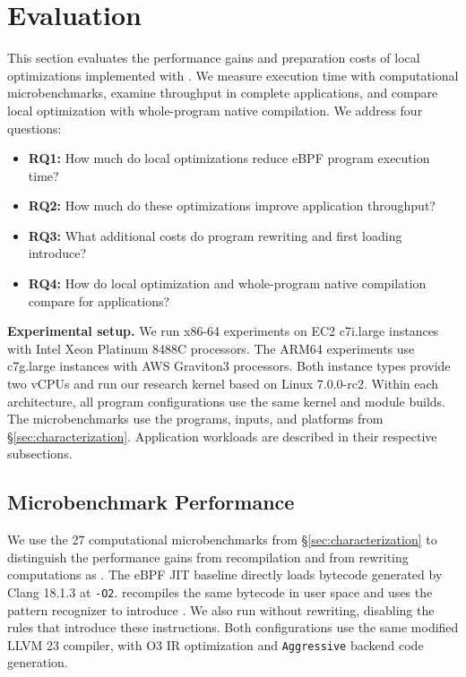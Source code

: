 \section{Evaluation}
\label{sec:eval}

This section evaluates the performance gains and preparation costs of local optimizations implemented with \kinsns. We measure execution time with computational microbenchmarks, examine throughput in complete applications, and compare local optimization with whole-program native compilation. We address four questions:

\begin{itemize}
\item \textbf{RQ1:} How much do local optimizations reduce eBPF program execution time?
\item \textbf{RQ2:} How much do these optimizations improve application throughput?
\item \textbf{RQ3:} What additional costs do program rewriting and first loading introduce?
\item \textbf{RQ4:} How do local optimization and whole-program native compilation compare for applications?
\end{itemize}

\noindent\textbf{Experimental setup.}
We run x86-64 experiments on EC2 c7i.large instances with Intel Xeon Platinum 8488C processors. The ARM64 experiments use c7g.large instances with AWS Graviton3 processors. Both instance types provide two vCPUs and run our research kernel based on Linux 7.0.0-rc2. Within each architecture, all program configurations use the same kernel and module builds. The microbenchmarks use the programs, inputs, and platforms from \S\ref{sec:characterization}. Application workloads are described in their respective subsections.

\subsection{Microbenchmark Performance}
\label{subsec:micro_benchmark}

We use the 27 computational microbenchmarks from \S\ref{sec:characterization} to distinguish the performance gains from recompilation and from rewriting computations as \kinsns. The eBPF JIT baseline directly loads bytecode generated by Clang 18.1.3 at \texttt{-O2}. \tool recompiles the same bytecode in user space and uses the pattern recognizer to introduce \kinsns. We also run \tool without \kinsn rewriting, disabling the rules that introduce these instructions. Both \tool configurations use the same modified LLVM 23 compiler, with O3 IR optimization and \texttt{Aggressive} backend code generation.

